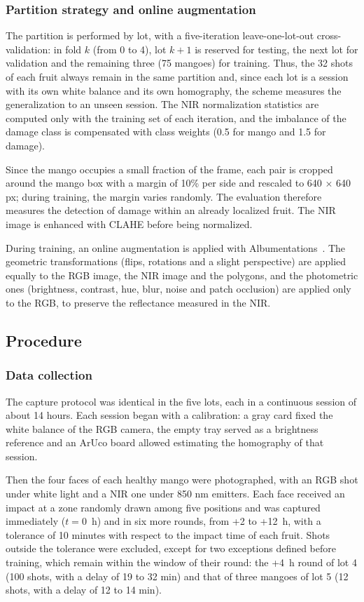 \documentclass[journal]{IEEEtran}
\begin{document}
\subsubsection{Partition strategy and online augmentation}\label{sec:partition}
The partition is performed by lot, with a five-iteration leave-one-lot-out cross-validation: in fold $k$ (from 0 to 4), lot $k+1$ is reserved for testing, the next lot for validation and the remaining three (75 mangoes) for training. Thus, the 32 shots of each fruit always remain in the same partition and, since each lot is a session with its own white balance and its own homography, the scheme measures the generalization to an unseen session. The NIR normalization statistics are computed only with the training set of each iteration, and the imbalance of the damage class is compensated with class weights (0.5 for mango and 1.5 for damage).

Since the mango occupies a small fraction of the frame, each pair is cropped around the mango box with a margin of 10\% per side and rescaled to 640 $\times$ 640 px; during training, the margin varies randomly. The evaluation therefore measures the detection of damage within an already localized fruit. The NIR image is enhanced with CLAHE before being normalized.

During training, an online augmentation is applied with Albumentations~\cite{buslaev2020}. The geometric transformations (flips, rotations and a slight perspective) are applied equally to the RGB image, the NIR image and the polygons, and the photometric ones (brightness, contrast, hue, blur, noise and patch occlusion) are applied only to the RGB, to preserve the reflectance measured in the NIR.

\subsection{Procedure}\label{sec:procedure}
\subsubsection{Data collection}\label{sec:collection}
The capture protocol was identical in the five lots, each in a continuous session of about 14 hours. Each session began with a calibration: a gray card fixed the white balance of the RGB camera, the empty tray served as a brightness reference and an ArUco board allowed estimating the homography of that session.

Then the four faces of each healthy mango were photographed, with an RGB shot under white light and a NIR one under 850 nm emitters. Each face received an impact at a zone randomly drawn among five positions and was captured immediately ($t = 0$~h) and in six more rounds, from +2 to +12~h, with a tolerance of 10 minutes with respect to the impact time of each fruit. Shots outside the tolerance were excluded, except for two exceptions defined before training, which remain within the window of their round: the +4~h round of lot 4 (100 shots, with a delay of 19 to 32 min) and that of three mangoes of lot 5 (12 shots, with a delay of 12 to 14 min).
\end{document}
